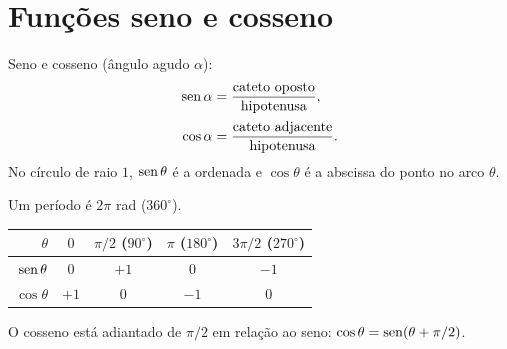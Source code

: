 \documentclass{notaaula}
\begin{document}
\section{Funções seno e cosseno}

\begin{copiar}{Seno e cosseno}
 (ângulo agudo $\alpha$):
\[
\begin{aligned}
  \operatorname{sen}\alpha &= \frac{\text{cateto oposto}}{\text{hipotenusa}},\\[2pt]
  \cos\alpha &= \frac{\text{cateto adjacente}}{\text{hipotenusa}}.
\end{aligned}
\]
No círculo de raio $1$, $\operatorname{sen}\theta$ é a ordenada e $\cos\theta$ é a abscissa
do ponto no arco $\theta$.

 Um período é $2\pi$ rad ($360^\circ$).
\begin{center}\footnotesize
\begin{tabular}{r|cccc}
\toprule
$\theta$      & $0$  & $\pi/2$ ($90^\circ$) & $\pi$ ($180^\circ$) & $3\pi/2$ ($270^\circ$)\\
\midrule
$\operatorname{sen}\theta$  & $0$  & $+1$ & $0$  & $-1$\\
$\cos\theta$  & $+1$ & $0$  & $-1$ & $0$\\
\bottomrule
\end{tabular}
\end{center}
O cosseno está adiantado de $\pi/2$ em relação ao seno:
$\cos\theta = \operatorname{sen}(\theta + \pi/2)$.
\end{copiar}
\end{document}
